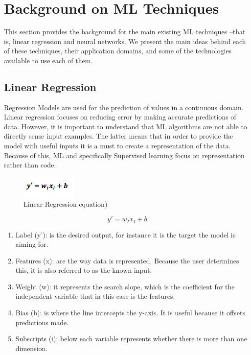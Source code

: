 

\section{Background on \acl{ML} Techniques}
\label{sec:related}

This section provides the background for the main existing \ac{ML} techniques --that is, linear 
regression and neural networks. We present the main ideas behind each of these techniques, their 
application domains, and some of the technologies available to use each of them. 

\subsection{Linear Regression}

Regression Models are used for the prediction of values in a continuous domain. Linear regression 
focuses on reducing error by making accurate predictions of data. However, it is important to understand that \ac{ML} algorithms are not able to directly sense input examples. The latter means that in order to provide the model with useful inputs it is a must to create a representation of the data. Because of this, \ac{ML} and specifically Supervised learning focus on representation rather than code. 

\begin{figure}[htbp]
  \centering
  \includegraphics[width=\textwidth]{images/regresion}
  \caption{Linear Regression equation)}
  \label{fig:regresion}
\end{figure}


\begin{equation} \label{eq:linearReg}
y'=w_I x_I+b
\end{equation}


\begin{enumerate}
 \item Label (y’): is the desired output, for instance it is the target the model is aiming for.
 \item Features (x):  are the way data is represented. Because the user determines this, it is also referred to as the known input.  
 \item Weight (w):  it represents the search slope, which is the coefficient for the independent variable that in this case is the features.  
 \item Bias (b): is where the line intercepts the y-axis. It is useful because it offsets predictions made. 
 \item Subscripts (i): below each variable represents whether there is more than one dimension.
\end{enumerate}

